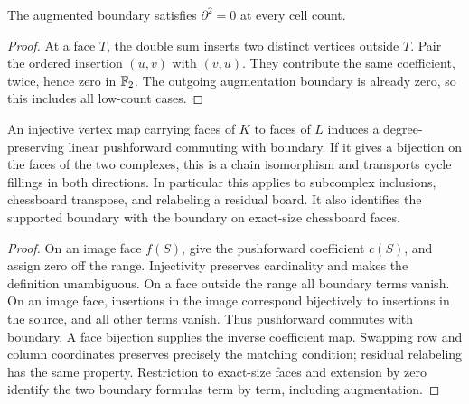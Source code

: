 \begin{lemma}\label{lem:h02}
The augmented boundary satisfies \(\partial^2=0\) at every cell count.
\end{lemma}
\begin{proof}
At a face \(T\), the double sum inserts two distinct vertices outside
\(T\). Pair the ordered insertion \((u,v)\) with \((v,u)\).
They contribute the same coefficient, twice, hence zero in \(\mathbb F_2\).
The outgoing augmentation boundary is already zero, so this includes
all low-count cases.
\end{proof}

\begin{lemma}\label{lem:h03}
An injective vertex map carrying faces of \(K\) to faces of \(L\)
induces a degree-preserving linear pushforward commuting with boundary.
If it gives a bijection on the faces of the two complexes, this is a
chain isomorphism and transports cycle fillings in both directions.
In particular this applies to subcomplex inclusions, chessboard transpose,
and relabeling a residual board. It also identifies the supported boundary
with the boundary on exact-size chessboard faces.
\end{lemma}
\begin{proof}
On an image face \(f(S)\), give the pushforward coefficient \(c(S)\),
and assign zero off the range. Injectivity preserves cardinality and
makes the definition unambiguous. On a face outside the range all boundary
terms vanish. On an image face, insertions in the image correspond
bijectively to insertions in the source, and all other terms vanish.
Thus pushforward commutes with boundary. A face bijection supplies the
inverse coefficient map. Swapping row and column coordinates preserves
precisely the matching condition; residual relabeling has the same property.
Restriction to exact-size faces and extension by zero identify the two
boundary formulas term by term, including augmentation.
\end{proof}

